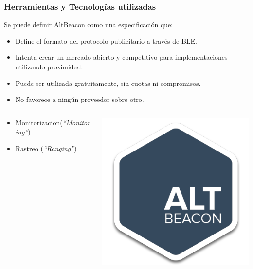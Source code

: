 \begin{frame}
	\frametitle{Herramientas y Tecnologías utilizadas}
			Se puede definir AltBeacon como una especificación que:
			\begin{itemize}
				\item {Define el formato del protocolo publicitario a través de BLE.}
				\item {Intenta crear un mercado abierto y competitivo para implementaciones utilizando proximidad.}
				\item {Puede ser utilizada gratuitamente, sin cuotas ni compromisos.}
				\item {No favorece a ningún proveedor sobre otro.}
			\end{itemize}
		\endblock{}
			\begin{columns}
				\begin{column}{0.7\textwidth}
					\begin{itemize}
						\item {Monitorizacion(\textit{``Monitoring''})}
						\item {Rastreo (\textit{``Ranging''})}
					\end{itemize}
				\end{column}
				\begin{column}{0.3\textwidth}
					\vfill 
					\begin{center}
						\includegraphics[width=0.5\linewidth]{Images/logos/altBeacon}
					\end{center}
				\end{column}
			\end{columns}
		\endblock{}
\end{frame}

